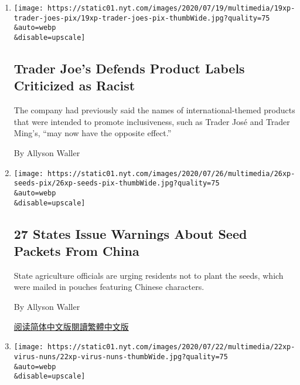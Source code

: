 \begin{enumerate}
\def\labelenumi{\arabic{enumi}.}
\item
  \href{/2020/08/01/us/trader-joes-jose-ming-joe-san.html}{}

  \texttt{[image: https://static01.nyt.com/images/2020/07/19/multimedia/19xp-trader-joes-pix/19xp-trader-joes-pix-thumbWide.jpg?quality=75\\\&auto=webp\\\&disable=upscale]}

  \hypertarget{trader-joes-defends-product-labels-criticized-as-racist}{%
  \subsection{Trader Joe's Defends Product Labels Criticized as
  Racist}\label{trader-joes-defends-product-labels-criticized-as-racist}}

  The company had previously said the names of international-themed
  products that were intended to promote inclusiveness, such as Trader
  José and Trader Ming's, ``may now have the opposite effect.''

  By Allyson Waller
\item
  \href{/2020/07/26/us/seeds-from-china-mail.html}{}

  \texttt{[image: https://static01.nyt.com/images/2020/07/26/multimedia/26xp-seeds-pix/26xp-seeds-pix-thumbWide.jpg?quality=75\\\&auto=webp\\\&disable=upscale]}

  \hypertarget{27-states-issue-warnings-about-seed-packets-from-china}{%
  \subsection{27 States Issue Warnings About Seed Packets From
  China}\label{27-states-issue-warnings-about-seed-packets-from-china}}

  State agriculture officials are urging residents not to plant the
  seeds, which were mailed in pouches featuring Chinese characters.

  By Allyson Waller

  \href{https://cn.nytimes.com/usa/20200728/seeds-from-china-mail/}{阅读简体中文版}\href{https://cn.nytimes.com/usa/20200728/seeds-from-china-mail/zh-hant/}{閱讀繁體中文版}
\item
  \href{/2020/07/23/us/nuns-die-covid-michigan.html}{}

  \texttt{[image: https://static01.nyt.com/images/2020/07/22/multimedia/22xp-virus-nuns/22xp-virus-nuns-thumbWide.jpg?quality=75\\\&auto=webp\\\&disable=upscale]}


\end{enumerate}

